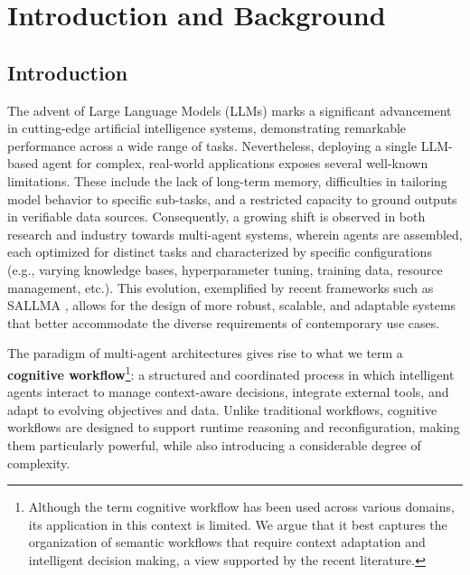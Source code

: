 \chapter{Introduction and Background}\label{ch:chapter1}


\section{Introduction} \label{sec:introduction}
The advent of Large Language Models (LLMs) marks a significant advancement in cutting-edge artificial intelligence systems, demonstrating remarkable performance across a wide range of tasks. Nevertheless, deploying a single LLM-based agent for complex, real-world applications exposes several well-known limitations. These include the lack of long-term memory, difficulties in tailoring model behavior to specific sub-tasks, and a restricted capacity to ground outputs in verifiable data sources. Consequently, a growing shift is observed in both research and industry towards multi-agent systems, wherein agents are assembled, each optimized for distinct tasks and characterized by specific configurations (e.g., varying knowledge bases, hyperparameter tuning, training data, resource management, etc.). This evolution, exemplified by recent frameworks such as SALLMA \cite{becattini2025sallma}, allows for the design of more robust, scalable, and adaptable systems that better accommodate the diverse requirements of contemporary use cases.

The paradigm of multi-agent architectures gives rise to what we term a \textbf{cognitive workflow}\footnote{Although the term cognitive workflow has been used across various domains, its application in this context is limited. We argue that it best captures the organization of semantic workflows that require context adaptation and intelligent decision making, a view supported by the recent literature.}: a structured and coordinated process in which intelligent agents interact to manage context-aware decisions, integrate external tools, and adapt to evolving objectives and data. Unlike traditional workflows, cognitive workflows are designed to support runtime reasoning and reconfiguration, making them particularly powerful, while also introducing a considerable degree of complexity.

